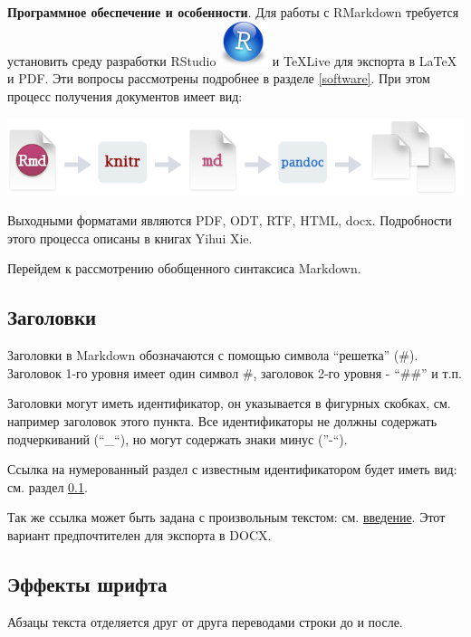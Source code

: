 \documentclass[
  a4paper,
]{book}
\theoremstyle{definition}
\theoremstyle{definition}
\theoremstyle{definition}
\theoremstyle{definition}
\theoremstyle{remark}
\begin{document}
\textbf{Программное обеспечение и особенности}. Для работы с RMarkdown требуется установить среду разработки RStudio \includegraphics{figures/rstudio.png} и TeXLive для экспорта в LaTeX и PDF. Эти вопросы рассмотрены подробнее в разделе \ref{software}. При этом процесс получения документов имеет вид:

\includegraphics{figures/Rmd.png}

Выходными форматами являются PDF, ODT, RTF, HTML, docx. Подробности этого процесса описаны в книгах Yihui Xie.

Перейдем к рассмотрению обобщенного синтаксиса Markdown.

\hypertarget{markdown-syntax-head}{%
\subsection{Заголовки}\label{markdown-syntax-head}}

Заголовки в Markdown обозначаются с помощью символа ``решетка'' (\#). Заголовок 1-го уровня имеет один символ \#, заголовок 2-го уровня - ``\#\#'' и т.п.

Заголовки могут иметь идентификатор, он указывается в фигурных скобках, см. например заголовок этого пункта. Все идентификаторы не должны содержать подчеркиваний (``\_``), но могут содержать знаки минус (''-``).

Ссылка на нумерованный раздел с известным идентификатором будет иметь вид: см. раздел \ref{markdown-syntax-head}.

Так же ссылка может быть задана с произвольным текстом: см. \protect\hyperlink{intro}{введение}. Этот вариант предпочтителен для экспорта в DOCX.

\hypertarget{markdown-syntax-style}{%
\subsection{Эффекты шрифта}\label{markdown-syntax-style}}

Абзацы текста отделяется друг от друга переводами строки до и после.
\end{document}
